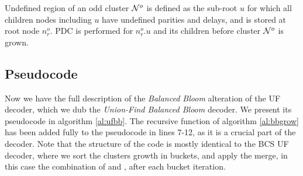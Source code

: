 \begin{theorem}\label{the:delayonce}
  Undefined region of an odd cluster $\mathcal{N}^o$ is defined as the sub-root $u$ for which all children nodes including $u$ have undefined parities and delays, and is stored at root node $n^o_r$. PDC is performed for $n^o_r.u$ and its children before cluster $\mathcal{N}^o$ is grown.
\end{theorem}

\subsection{Pseudocode}
Now we have the full description of the \emph{Balanced Bloom} alteration of the UF decoder, which we dub the \emph{Union-Find Balanced Bloom} decoder. We present its pseudocode in algorithm \ref{al:ufbb}. The recursive  function of algorithm \ref{al:bbgrow} has been added fully to the pseudocode in lines 7-12, as it is a crucial part of the decoder. Note that the structure of the code is mostly identical to the BCS UF decoder, where we sort the clusters growth in buckets, and apply the merge, in this case the combination of  and , after each bucket iteration.

\begin{algo}[algotitle=Union-Find Balanced Bloom, label=al:ufbb]
\begin{algorithm}[H]

\KwData{\buckets}

\BlankLine

\end{algorithm}
\end{algo}


